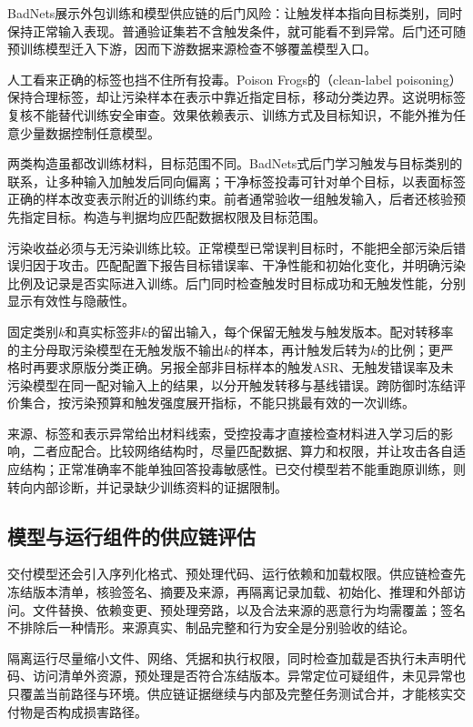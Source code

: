 BadNets展示外包训练和模型供应链的后门风险：让触发样本指向目标类别，同时保持正常输入表现。普通验证集若不含触发条件，就可能看不到异常。后门还可随预训练模型迁入下游，因而下游数据来源检查不够覆盖模型入口。

人工看来正确的标签也挡不住所有投毒。Poison Frogs的（clean-label poisoning）保持合理标签，却让污染样本在表示中靠近指定目标，移动分类边界。这说明标签复核不能替代训练安全审查。效果依赖表示、训练方式及目标知识，不能外推为任意少量数据控制任意模型。

两类构造虽都改训练材料，目标范围不同。BadNets式后门学习触发与目标类别的联系，让多种输入加触发后同向偏离；干净标签投毒可针对单个目标，以表面标签正确的样本改变表示附近的训练约束。前者通常验收一组触发输入，后者还核验预先指定目标。构造与判据均应匹配数据权限及目标范围。

污染收益必须与无污染训练比较。正常模型已常误判目标时，不能把全部污染后错误归因于攻击。匹配配置下报告目标错误率、干净性能和初始化变化，并明确污染比例及记录是否实际进入训练。后门同时检查触发时目标成功和无触发性能，分别显示有效性与隐蔽性。

固定类别$k$和真实标签非$k$的留出输入，每个保留无触发与触发版本。配对转移率的主分母取污染模型在无触发版不输出$k$的样本，再计触发后转为$k$的比例；更严格时再要求原版分类正确。另报全部非目标样本的触发ASR、无触发错误率及未污染模型在同一配对输入上的结果，以分开触发转移与基线错误。跨防御时冻结评价集合，按污染预算和触发强度展开指标，不能只挑最有效的一次训练。

来源、标签和表示异常给出材料线索，受控投毒才直接检查材料进入学习后的影响，二者应配合。比较网络结构时，尽量匹配数据、算力和权限，并让攻击各自适应结构；正常准确率不能单独回答投毒敏感性。已交付模型若不能重跑原训练，则转向内部诊断，并记录缺少训练资料的证据限制。

\subsection{模型与运行组件的供应链评估}
\label{sec:security-supply-chain-test}

交付模型还会引入序列化格式、预处理代码、运行依赖和加载权限。供应链检查先冻结版本清单，核验签名、摘要及来源，再隔离记录加载、初始化、推理和外部访问。文件替换、依赖变更、预处理旁路，以及合法来源的恶意行为均需覆盖；签名不排除后一种情形。来源真实、制品完整和行为安全是分别验收的结论。

隔离运行尽量缩小文件、网络、凭据和执行权限，同时检查加载是否执行未声明代码、访问清单外资源，预处理是否符合冻结版本。异常定位可疑组件，未见异常也只覆盖当前路径与环境。供应链证据继续与内部及完整任务测试合并，才能核实交付物是否构成损害路径。

